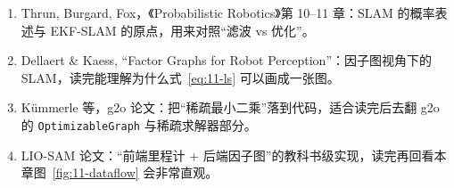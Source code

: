 \begin{reading}
\begin{enumerate}
  \item Thrun, Burgard, Fox，《Probabilistic Robotics》第 10--11 章\cite{thrun2005probabilistic}：SLAM 的概率表述与 EKF-SLAM 的原点，用来对照``滤波 vs 优化''。
  \item Dellaert \& Kaess, ``Factor Graphs for Robot Perception''\cite{dellaert2017factorgraphs}：因子图视角下的 SLAM，读完能理解为什么式~\eqref{eq:11-ls} 可以画成一张图。
  \item Kümmerle 等，g2o 论文\cite{kummerle2011g2o}：把``稀疏最小二乘''落到代码，适合读完后去翻 g2o 的 \lstinline{OptimizableGraph} 与稀疏求解器部分。
  \item LIO-SAM 论文\cite{shan2020liosam}：``前端里程计 + 后端因子图''的教科书级实现，读完再回看本章图~\ref{fig:11-dataflow} 会非常直观。
\end{enumerate}


\end{reading}
